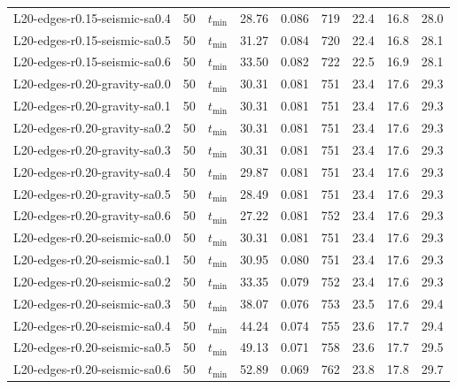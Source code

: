 \begin{longtable}{lrlrrrrrr}
L20-edges-r0.15-seismic-sa0.4 & 50 & $t_{\mathrm{min}}$ & 28.76 & 0.086 & 719 & 22.4 & 16.8 & 28.0 \\
L20-edges-r0.15-seismic-sa0.5 & 50 & $t_{\mathrm{min}}$ & 31.27 & 0.084 & 720 & 22.4 & 16.8 & 28.1 \\
L20-edges-r0.15-seismic-sa0.6 & 50 & $t_{\mathrm{min}}$ & 33.50 & 0.082 & 722 & 22.5 & 16.9 & 28.1 \\
L20-edges-r0.20-gravity-sa0.0 & 50 & $t_{\mathrm{min}}$ & 30.31 & 0.081 & 751 & 23.4 & 17.6 & 29.3 \\
L20-edges-r0.20-gravity-sa0.1 & 50 & $t_{\mathrm{min}}$ & 30.31 & 0.081 & 751 & 23.4 & 17.6 & 29.3 \\
L20-edges-r0.20-gravity-sa0.2 & 50 & $t_{\mathrm{min}}$ & 30.31 & 0.081 & 751 & 23.4 & 17.6 & 29.3 \\
L20-edges-r0.20-gravity-sa0.3 & 50 & $t_{\mathrm{min}}$ & 30.31 & 0.081 & 751 & 23.4 & 17.6 & 29.3 \\
L20-edges-r0.20-gravity-sa0.4 & 50 & $t_{\mathrm{min}}$ & 29.87 & 0.081 & 751 & 23.4 & 17.6 & 29.3 \\
L20-edges-r0.20-gravity-sa0.5 & 50 & $t_{\mathrm{min}}$ & 28.49 & 0.081 & 751 & 23.4 & 17.6 & 29.3 \\
L20-edges-r0.20-gravity-sa0.6 & 50 & $t_{\mathrm{min}}$ & 27.22 & 0.081 & 752 & 23.4 & 17.6 & 29.3 \\
L20-edges-r0.20-seismic-sa0.0 & 50 & $t_{\mathrm{min}}$ & 30.31 & 0.081 & 751 & 23.4 & 17.6 & 29.3 \\
L20-edges-r0.20-seismic-sa0.1 & 50 & $t_{\mathrm{min}}$ & 30.95 & 0.080 & 751 & 23.4 & 17.6 & 29.3 \\
L20-edges-r0.20-seismic-sa0.2 & 50 & $t_{\mathrm{min}}$ & 33.35 & 0.079 & 752 & 23.4 & 17.6 & 29.3 \\
L20-edges-r0.20-seismic-sa0.3 & 50 & $t_{\mathrm{min}}$ & 38.07 & 0.076 & 753 & 23.5 & 17.6 & 29.4 \\
L20-edges-r0.20-seismic-sa0.4 & 50 & $t_{\mathrm{min}}$ & 44.24 & 0.074 & 755 & 23.6 & 17.7 & 29.4 \\
L20-edges-r0.20-seismic-sa0.5 & 50 & $t_{\mathrm{min}}$ & 49.13 & 0.071 & 758 & 23.6 & 17.7 & 29.5 \\
L20-edges-r0.20-seismic-sa0.6 & 50 & $t_{\mathrm{min}}$ & 52.89 & 0.069 & 762 & 23.8 & 17.8 & 29.7 \\
\end{longtable}
